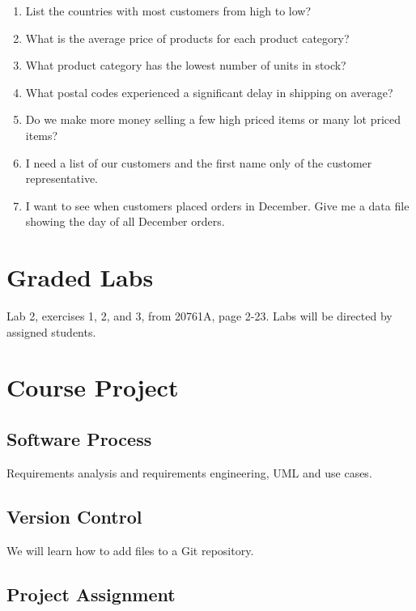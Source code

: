\documentclass{article}
\begin{document}
    \begin{enumerate}
\item List the countries with most customers from high to low?
\item What is the average price of products for each product category?
\item What product category has the lowest number of units in stock?
\item What postal codes experienced a significant delay in shipping on average?
\item Do we make more money selling a few high priced items or many lot priced items?
\item I need a list of our customers and the first name only of the customer representative.
\item I want to see when customers placed orders in December. Give me a data file showing the day of all December orders.
    
    \end{enumerate}



    \section{Graded Labs}

Lab 2, exercises 1, 2, and 3, from 20761A, page 2-23. Labs will be directed by assigned students.


    \section{Course Project}


        \subsection{Software Process}

        Requirements analysis and requirements engineering, UML and use cases.
        
        \subsection{Version Control}

        We will learn how to add files to a Git repository.

        \subsection{Project Assignment}
\end{document}

